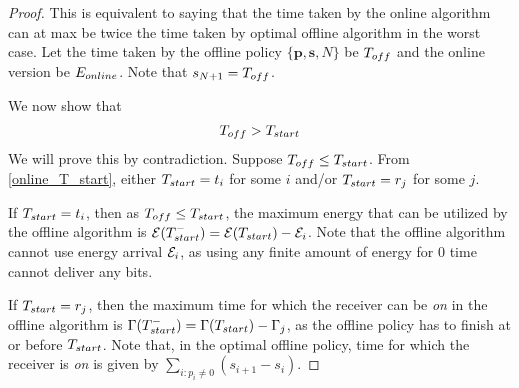 \begin{proof}
This is equivalent to saying that the time taken by the online algorithm can at max be twice the time taken by optimal offline algorithm in the worst case. Let the time taken by the offline policy $\{\bm{p},\bm{s},N\}$  be $T_{\mbox{\scriptsize{off}}}$ and the online version be $E_{\mbox{\scriptsize{online}}}$. Note that $s_{N+1}=T_{\mbox{\scriptsize{off}}}$.

We now show that 
\begin{align}
T_{\mbox{\scriptsize{off}}} > T_{\mbox{\scriptsize{start}}}
\label{online_time}
\end{align}
We will prove this by contradiction. Suppose $T_{\mbox{\scriptsize{off}}}\le T_{\mbox{\scriptsize{start}}}$. From \eqref{online_T_start}, either $T_{\mbox{\scriptsize{start}}}=t_i$ for some $i$ and/or $T_{\mbox{\scriptsize{start}}}=r_j$ for some $j$.

If $T_{\mbox{\scriptsize{start}}}=t_i$, then as $T_{\mbox{\scriptsize{off}}}\le T_{\mbox{\scriptsize{start}}}$, the maximum energy that can be utilized by the offline algorithm is $\ETx(T_{\mbox{\scriptsize{start}}}^-)=\ETx(T_{\mbox{\scriptsize{start}}})-\ETx_i$. Note that the offline algorithm cannot use energy arrival $\mathcal{E}_i$, as using any finite amount of energy for 0 time cannot deliver any bits. 

If $T_{\mbox{\scriptsize{start}}}=r_j$, then the maximum time for which the receiver can be \textit{on} in the offline algorithm is $\TRx(T_{\mbox{\scriptsize{start}}}^-)=\TRx(T_{\mbox{\scriptsize{start}}})-\TRx_j$, as the offline policy has to finish at or before $T_{\mbox{\scriptsize{start}}}$. Note that, in the optimal offline policy, time for which the receiver is \textit{on} is given by $\displaystyle \sum_{i:p_i\neq 0}(s_{i+1}-s_i)$. 


\end{proof}
